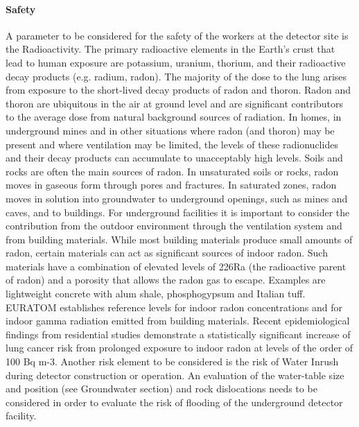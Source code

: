 \paragraph{Safety}  A parameter to be considered for the safety of the workers at the detector site is the Radioactivity. The primary radioactive elements in the Earth’s crust that lead to human exposure are potassium, uranium, thorium, and their radioactive decay products (e.g. radium, radon). The majority of the dose to the lung arises from exposure to the short-lived decay products of radon and thoron. Radon and thoron are ubiquitous in the air at ground level and are significant contributors to the average dose from natural background sources of radiation. In homes, in underground mines and in other situations where radon (and thoron) may be present and where ventilation may be limited, the levels of these radionuclides and their decay products can accumulate to unacceptably high levels. Soils and rocks are often the main sources of radon. In unsaturated soils or rocks, radon moves in gaseous form through pores and fractures. In saturated zones, radon moves in solution into groundwater to underground openings, such as mines and caves, and to buildings. For underground facilities it is important to consider the contribution from the outdoor environment through the ventilation system and from building materials. While most building materials produce small amounts of radon, certain materials can act as significant sources of indoor radon. Such materials have a combination of elevated levels of 226Ra (the radioactive parent of radon) and a porosity that allows the radon gas to escape. Examples are lightweight concrete with alum shale, phosphogypsum and Italian tuff. EURATOM establishes reference levels for indoor radon concentrations and for indoor gamma radiation emitted from building materials. Recent epidemiological findings from residential studies demonstrate a statistically significant increase of lung cancer risk from prolonged exposure to indoor radon at levels of the order of 100 Bq m-3. 
Another risk element to be considered is the risk of Water Inrush during detector construction or operation.  An evaluation of the water-table size and position (see Groundwater section) and rock dislocations needs to be considered in order to evaluate the risk of flooding of the underground detector facility.

